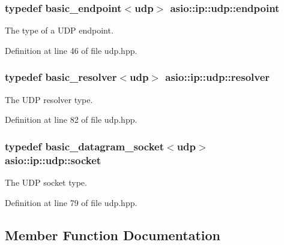 \subsubsection[{endpoint}]{\setlength{\rightskip}{0pt plus 5cm}typedef {\bf basic\+\_\+endpoint}$<${\bf udp}$>$ {\bf asio\+::ip\+::udp\+::endpoint}}\label{classasio_1_1ip_1_1udp_a6356426903164272827153752845368c}


The type of a U\+D\+P endpoint. 



Definition at line 46 of file udp.\+hpp.

\hypertarget{classasio_1_1ip_1_1udp_abb4d8eff41b11c6c2053bf799d43dba2}{}
\subsubsection[{resolver}]{\setlength{\rightskip}{0pt plus 5cm}typedef {\bf basic\+\_\+resolver}$<${\bf udp}$>$ {\bf asio\+::ip\+::udp\+::resolver}}\label{classasio_1_1ip_1_1udp_abb4d8eff41b11c6c2053bf799d43dba2}


The U\+D\+P resolver type. 



Definition at line 82 of file udp.\+hpp.

\hypertarget{classasio_1_1ip_1_1udp_ab8f8cc1a666bdbbd6c3963f2396f253e}{}
\subsubsection[{socket}]{\setlength{\rightskip}{0pt plus 5cm}typedef {\bf basic\+\_\+datagram\+\_\+socket}$<${\bf udp}$>$ {\bf asio\+::ip\+::udp\+::socket}}\label{classasio_1_1ip_1_1udp_ab8f8cc1a666bdbbd6c3963f2396f253e}


The U\+D\+P socket type. 



Definition at line 79 of file udp.\+hpp.



\subsection{Member Function Documentation}
\hypertarget{classasio_1_1ip_1_1udp_aec7ea9c65873b353460f304721c415f9}{}
